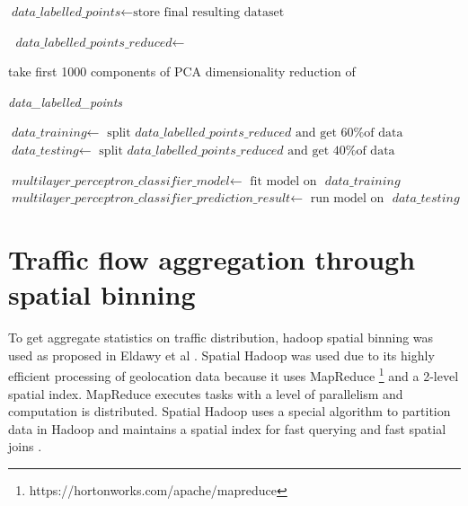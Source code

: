 \documentclass[12pt, a4paper]{report}
\theoremstyle{definition}
\theoremstyle{definition}%
\theoremstyle{definition}%
\theoremstyle{definition}%
\theoremstyle{definition}%
\theoremstyle{definition}%
\begin{document}
\begin{algorithm} [hpt]
\begin{algorithmic}[1]
			\State $\textit{data\_labelled\_points} \gets \text{store final resulting dataset}$
			
			\State $\textit{ data\_labelled\_points\_reduced} \gets$ \par 
					take first 1000 components of PCA dimensionality reduction of \par 
					\textit{ data\_labelled\_points}
			
			\State $\textit{data\_training} 	\gets$  $ \text{split } \textit{data\_labelled\_points\_reduced} \text{ and get 60\% of data }$
			\State $\textit{data\_testing} 	    \gets$  $ \text{split } \textit{data\_labelled\_points\_reduced} \text{ and get 40\% of data }$
			
			\State $\textit{multilayer\_perceptron\_classifier\_model} 	\gets$  $\text{fit model on } \textit{ data\_training}$	
			\State $\textit{multilayer\_perceptron\_classifier\_prediction\_result} 	\gets$  $\text{run model on } \textit{ data\_testing}$	
			\State {}
					
			
		\EndIndent 			

	\end{algorithmic}
\end{algorithm}




\section{Traffic flow aggregation through spatial binning} \label{section:spatial_binning}

To get aggregate statistics on traffic distribution, hadoop spatial binning was used as proposed in Eldawy et al \cite{eldawy2015spatialhadoop}. Spatial Hadoop was used due to its highly efficient processing of geolocation data because it uses MapReduce \footnote{https://hortonworks.com/apache/mapreduce} and a 2-level spatial index. MapReduce executes tasks with a level of parallelism and computation is distributed. Spatial Hadoop uses a special algorithm to partition data in Hadoop and maintains a spatial index for fast querying and fast spatial joins \cite{eldawy2015spatialhadoop}. 
\end{document}
